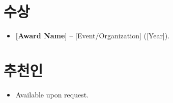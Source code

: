 \documentclass[11pt,a4paper,sans]{moderncv}
\begin{document}
\section{수상}
\vspace{1pt}
\begin{itemize}
\item{\textbf{[Award Name]} -- [Event/Organization] ([Year]).}
\end{itemize}


\section{추천인}
\vspace{1pt}
\begin{itemize}
\item{Available upon request.}
\end{itemize}
\end{document}
